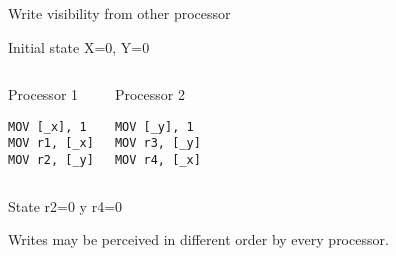 \begin{frame}[t,fragile]{Write visibility from other processor}

\begin{block}{Initial state}
X=0, Y=0
\end{block}


\begin{columns}[T]


\begin{block}{Processor 1}
\begin{lstlisting}[language={[x86masm]Assembler}]
MOV [_x], 1
MOV r1, [_x]
MOV r2, [_y]
\end{lstlisting}
\end{block}

\begin{block}{Processor 2}
\begin{lstlisting}[language={[x86masm]Assembler}]
MOV [_y], 1
MOV r3, [_y]
MOV r4, [_x]
\end{lstlisting}
\end{block}

\end{columns}


\begin{block}{State }
r2=0 y r4=0
\end{block}

{\footnotesize Writes may be perceived in different order by every processor.}

\end{frame}



